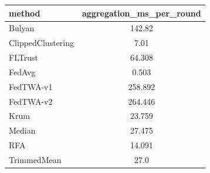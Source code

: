 \begin{tabular}{lc}
\toprule
method & aggregation\_ms\_per\_round \\
\midrule
Bulyan & 142.82 \\
ClippedClustering & 7.01 \\
FLTrust & 64.308 \\
FedAvg & 0.503 \\
FedTWA-v1 & 258.892 \\
FedTWA-v2 & 264.446 \\
Krum & 23.759 \\
Median & 27.475 \\
RFA & 14.091 \\
TrimmedMean & 27.0 \\
\bottomrule
\end{tabular}